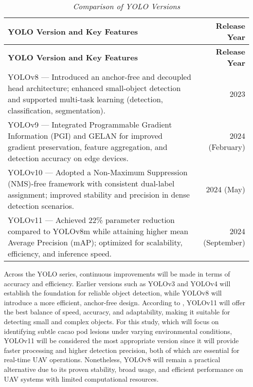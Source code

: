 \begin{longtable}{p{8cm} r}
	\caption{\textit{Comparison of YOLO Versions}} \label{tab:yolo_comparison} \\
	
	\toprule
	\textbf{YOLO Version and Key Features} & \textbf{Release Year} \\
	\midrule
	\endfirsthead
	
	\toprule
	\textbf{YOLO Version and Key Features} & \textbf{Release Year} \\
	\midrule
	\endhead
	
	\bottomrule
	\endfoot
	
	YOLOv8 — Introduced an anchor-free and decoupled head architecture; enhanced small-object detection and supported multi-task learning (detection, classification, segmentation). & 2023 \\
	\midrule
	YOLOv9 — Integrated Programmable Gradient Information (PGI) and GELAN for improved gradient preservation, feature aggregation, and detection accuracy on edge devices. & 2024 (February) \\
	\midrule
	YOLOv10 — Adopted a Non-Maximum Suppression (NMS)-free framework with consistent dual-label assignment; improved stability and precision in dense detection scenarios. & 2024 (May) \\
	\midrule
	YOLOv11 — Achieved 22\% parameter reduction compared to YOLOv8m while attaining higher mean Average Precision (mAP); optimized for scalability, efficiency, and inference speed. & 2024 (September) \\
\end{longtable}

Across the YOLO series, continuous improvements will be made in terms of accuracy and efficiency. Earlier versions such as YOLOv3 and YOLOv4 will establish the foundation for reliable object detection, while YOLOv8 will introduce a more efficient, anchor-free design. According to \cite{UltralyticsBlog2025}, YOLOv11 will offer the best balance of speed, accuracy, and adaptability, making it suitable for detecting small and complex objects. For this study, which will focus on identifying subtle cacao pod lesions under varying environmental conditions, YOLOv11 will be considered the most appropriate version since it will provide faster processing and higher detection precision, both of which are essential for real-time UAV operations. Nonetheless, YOLOv8 will remain a practical alternative due to its proven stability, broad usage, and efficient performance on UAV systems with limited computational resources.

